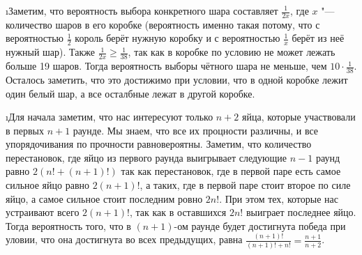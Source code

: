 \i Заметим, что вероятность выбора конкретного шара составляет $\frac{1}{2x}$, где $x$ "--- количество шаров в его коробке (вероятность именно такая потому, что с вероятностью $\frac{1}{2}$ король берёт нужную коробку и с вероятностью $\frac{1}{x}$ берёт из неё нужный шар). Также $\frac{1}{2x} \geq \frac{1}{38}$, так как в коробке по условию не может лежать больше 19 шаров. Тогда вероятность выборы чётного шара не меньше, чем $10 \cdot \frac{1}{38}$. Осталось заметить, что это достижимо при условии, что в одной коробке лежит один белый шар, а все осталбные лежат в другой коробке.

\i Для начала заметим, что нас интересуют только $n+2$ яйца, которые участвовали в первых $n+1$ раунде. Мы знаем, что все их процности различны, и все упорядочивания по прочности равновероятны. Заметим, что количество перестановок, где яйцо из первого раунда выигрывает следующие $n-1$ раунд равно $2(n! + (n+1)!)$ так как перестановок, где в первой паре есть самое сильное яйцо равно $2(n+1)!$, а таких, где в первой паре стоит второе по силе яйцо, а самое сильное стоит последним ровно $2n!$. При этом тех, которые нас устраивают всего $2(n+1)!$, так как в оставшихся $2n!$ выиграет последнее яйцо. Тогда вероятность того, что в $(n+1)$-ом раунде будет достигнута победа при уловии, что она достигнута во всех предыдущих, равна $\frac{(n+1)!}{(n+1)! + n!} = \frac{n+1}{n+2}$.